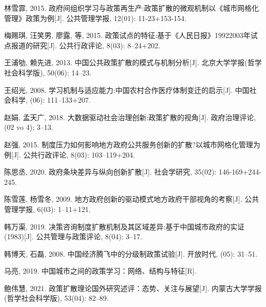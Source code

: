 \documentclass[
  12pt,
]{ctexart}
\newlength{\cslhangindent}
\newlength{\cslentryspacingunit} %
\newenvironment{CSLReferences}[2] %
 {%
  \setlength{\parindent}{0pt}
  \ifodd #1
  \let\oldpar\par
  \def\par{\hangindent=\cslhangindent\oldpar}
  \fi
  \setlength{\parskip}{#2\cslentryspacingunit}
 }%
 {}
\begin{document}
\begin{CSLReferences}{1}{0}
\leavevmode{}%
林雪霏, 2015. {政府间组织学习与政策再生产:政策扩散的微观机制\textemdash\textemdash 以{《城市网格化管理》}政策为例}{[}J{]}. 公共管理学报, 12(01): 11-23+153-154.

\leavevmode{}%
梅赐琪, 汪笑男, 廖露, 等, 2015. {政策试点的特征:基于《人民日报》1992\textemdash 2003年试点报道的研究}{[}J{]}. 公共行政评论, 8(03): 8--24+202.

\leavevmode{}%
王浦劬, 赖先进, 2013. {中国公共政策扩散的模式与机制分析}{[}J{]}. 北京大学学报(哲学社会科学版), 50(06): 14--23.

\leavevmode{}%
王绍光, 2008. {学习机制与适应能力:中国农村合作医疗体制变迁的启示}{[}J{]}. 中国社会科学, (06): 111--133+207.

\leavevmode{}%
赵娟, 孟天广, 2018. {大数据驱动社会治理创新:政策扩散的视角}{[}J{]}. 政府治理评论, (02 vo 4): 3--13.

\leavevmode{}%
赵强, 2015. {制度压力如何影响地方政府公共服务创新的扩散?\textemdash\textemdash 以城市网格化管理为例}{[}J{]}. 公共行政评论, 8(03): 103--119+204.

\leavevmode{}%
陈思丞, 2020. {政府条块差异与纵向创新扩散}{[}J{]}. 社会学研究, 35(02): 146-169+244-245.

\leavevmode{}%
陈雪莲, 杨雪冬, 2009. {地方政府创新的驱动模式\textemdash\textemdash 地方政府干部视角的考察}{[}J{]}. 公共管理学报, 6(03): 1--11+121.

\leavevmode{}%
韩万渠, 2019. {决策咨询制度扩散机制及其区域差异:基于中国城市政府的实证(1983)}{[}J{]}. 公共管理与政策评论, 8(04): 3--17.

\leavevmode{}%
韩博天, 石磊, 2008. {中国经济腾飞中的分级制政策试验}{[}J{]}. 开放时代, (05): 31--51.

\leavevmode{}%
马亮, 2019. 中国城市之间的政策学习：网络、结构与特征{[}R{]}.

\leavevmode{}%
鲍伟慧, 2021. {政策扩散理论国外研究述评：态势、关注与展望}{[}J{]}. 内蒙古大学学报(哲学社会科学版), 53(04): 82--89.

\end{CSLReferences}
\end{document}
